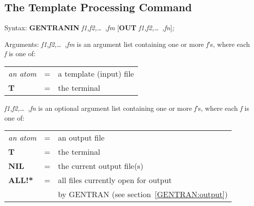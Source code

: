 \subsection{The Template Processing Command}
\label{templates} 
\begin{describe}{Syntax:}
{\bf GENTRANIN} {\it f1,f2,\dots\ ,fm} [{\bf OUT} {\it f1,f2,\dots\
 ,fn\/}]{\it ;}
\end{describe}
\begin{describe}{Arguments:}
{\it f1,f2,\dots\ ,fm\/} is an argument list containing one or more
{\it f\/}'s,
where each {\it f\/} is one of:
\begin{center}
\begin{tabular}{lll}
{\it an atom}& = &a template (input) file\\
{\bf T}& = &the terminal\\
\end{tabular}
\end{center}
{\it f1,f2,\dots\ ,fn\/} is an optional argument list containing one or more
{\it f\/}'s, where each {\it f\/} is one of:
\begin{center}
\begin{tabular}{lll}
{\it an atom}& = &an output file\\
{\bf T}& = &the terminal\\
{\bf NIL}& = &the current output file(s)\\
{\bf ALL!*}& = &all files currently open for output \\
& &  by GENTRAN (see section~\ref{GENTRAN:output}) \\
\end{tabular}
\end{center}
\end{describe}
